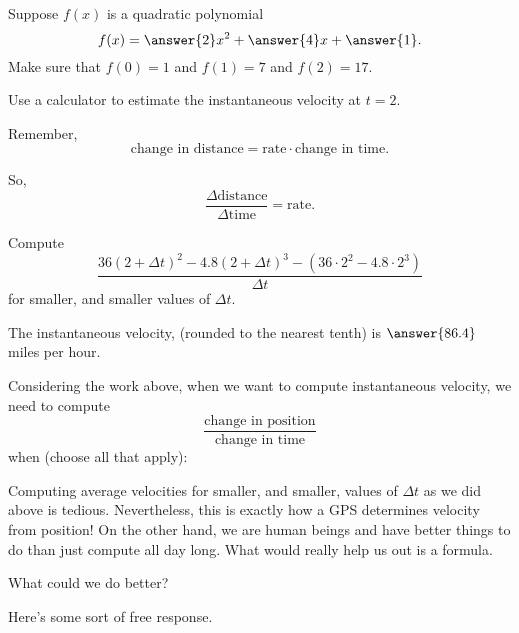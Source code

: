 \documentclass{ximera}
\begin{document}
\begin{problem}
Suppose $f(x)$ is a quadratic polynomial 
\[
f(x) = \answer{2}x^2 + \answer{4}x + \answer{1}.
\]
Make sure that $f(0) = 1$ and $f(1) = 7$ and $f(2) = 17$.
\end{problem}

\begin{problem}
  Use a calculator to estimate the instantaneous velocity at $t=2$.
  \begin{hint}
    Remember, 
    \[
    \text{change in distance} = \text{rate}\cdot\text{change in time}.
    \]
  \end{hint}
  \begin{hint}
    So, 
    \[
    \frac{\Delta\text{distance}}{\Delta\text{time}} = \text{rate}.
    \]
  \end{hint}
  \begin{hint}
    Compute
    \[
    \frac{36(2+\Delta t)^2 -4.8(2+\Delta t)^3 -\left(36\cdot 2^2 -4.8\cdot 2^3\right) }{\Delta t}
    \]
    for smaller, and smaller values of $\Delta t$.
  \end{hint}
  \begin{prompt}
    The instantaneous velocity, (rounded to the nearest tenth) is $\answer{86.4}$ miles per hour.
  \end{prompt}
\end{problem}


\begin{problem}
  Considering the work above, when we want to compute instantaneous
  velocity, we need to compute
  \[
  \frac{\text{change in position}}{\text{change in time}}
  \]
  when (choose all that apply):
  \begin{multipleChoice}
  \end{multipleChoice}
\end{problem}


Computing average velocities for smaller, and smaller, values of
$\Delta t$ as we did above is tedious. Nevertheless, this is exactly
how a GPS determines velocity from position! On the other hand, we are
human beings and have better things to do than just compute all day
long. What would really help us out is a formula.

What could we do better?
\begin{freeResponse}
Here's some sort of free response.
\end{freeResponse}
\end{document}
